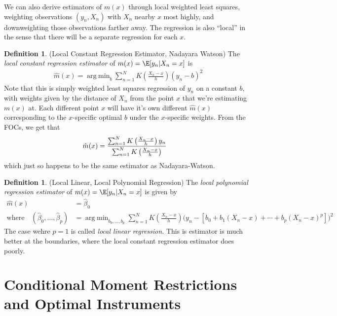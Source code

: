 \documentclass[12pt]{article}
\theoremstyle{plain}
\theoremstyle{definition}
\newtheorem{defn}[thm]{Definition}
\theoremstyle{remark}
\DeclareMathOperator*{\argmin}{arg\;min}
\newcommand{\sumnN}{\sum^N_{n=1}}
\begin{document}
\clearpage

We can also derive estimators of $m(x)$ through local weighted least
squares, weighting observations $(y_n,X_n)$ with $X_n$ nearby $x$ most
highly, and downweighting those observations farther away.
The regression is also ``local'' in the sense that there will be a
separate regression for each $x$.

\begin{defn}(Local Constant Regression Estimator, Nadayara Watson)
The \emph{local constant regression estimator} of $m(x)=\E[y_n|X_n=x]$
is
\begin{align*}
  \hat{m}(x)
  =
  \argmin_{b}
  \sumnN
  K\left(
  \frac{X_n-x}{h}
  \right)
  (y_n-b)^2
\end{align*}
Note that this is simply weighted least squares regression of $y_n$ on a
constant $b$, with weights given by the distance of $X_n$ from the point
$x$ that we're estimating $m(x)$ at.
Each different point $x$ will have it's own different $\hat{m}(x)$
corresponding to the $x$-specific optimal $b$ under the $x$-specific
weights.
From the FOCs, we get that
\begin{align*}
  \hat{m}(x)
  &=
  \frac{%
    \sumnN
    K\left(
    \frac{X_n-x}{h}
    \right)
    y_n
  }{%
    \sumnN
    K\left( \frac{X_n-x}{h}
    \right)
  }
\end{align*}
which just so happens to be the same estimator as Nadayara-Watson.
\end{defn}

\begin{defn}(Local Linear, Local Polynomial Regression)
The \emph{local polynomial regression estimator} of $m(x)=\E[y_n|X_n=x]$
is given by \begin{align*}
  \hat{m}(x)
  &=
  \hat{\beta}_0
  \\
  \text{where}\quad
  (\hat{\beta}_0,\ldots,\hat{\beta}_p)
  &=
  \argmin_{b_0,\ldots,b_p}
  \sumnN
  K\left(
  \frac{X_n-x}{h}
  \right)
  \big(y_n-[b_0+b_1(X_n-x)+\cdots +b_p(X_n-x)^p]\big)^2
\end{align*}
The case wehre $p=1$ is called \emph{local linear regression}.
This is estimator is much better at the boundaries, where the local
constant regression estimator does poorly.
\end{defn}


\clearpage
\section{Conditional Moment Restrictions and Optimal Instruments}
\end{document}
